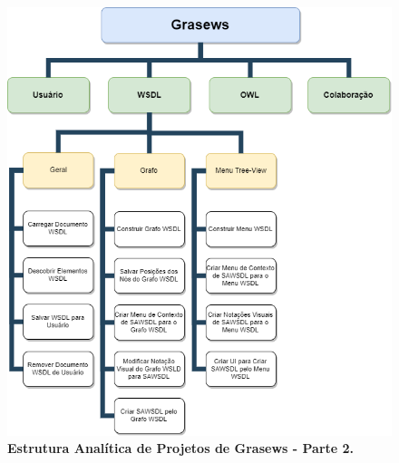    \begin{figure}[h]
            \includegraphics[scale=0.45]{9-pos-textuais/apendices/imagens/grasews-eap-wsdl.png}
        \centering
        \caption[Estrutura Analítica de Projetos de Grasews - Parte 2]{\textbf{Estrutura Analítica de Projetos de Grasews - Parte 2.}}
        \label{fig:grasews-eap-wsdl}
    \end{figure}

